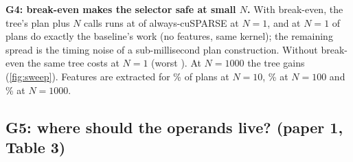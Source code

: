 \textbf{G4: break-even makes the selector safe at small $N$.} With break-even, the tree's plan plus $N$ calls runs at
\x{} of always-cuSPARSE at $N=1$, and at $N=1$  of  plans
do exactly the baseline's work (no features, same kernel); the remaining spread is the timing noise of a sub-millisecond
plan construction. Without break-even the same tree costs \x{} at $N=1$ (worst
\x). At $N=1000$ the tree gains \x{} (\cref{fig:sweep}). Features
are extracted for \% of plans at $N=10$, \% at $N=100$ and
\% at $N=1000$.

\begin{table}[t]
\centering\small
\caption{Total time (plan + $N$ calls) vs always-cuSPARSE: geometric mean [worst case].}\label{tab:g4}
\end{table}

\subsection{G5: where should the operands live? (paper 1, Table 3)}\label{sec:eval-g5}
\begin{table}[t]
\centering\small
\caption{cuSPARSE SpGEMM with each operand in device (D), pinned zero-copy (P) or managed (M) memory: slowdown
against all-device. Our version of paper~1's Table~3.}\label{tab:placement}
\end{table}

